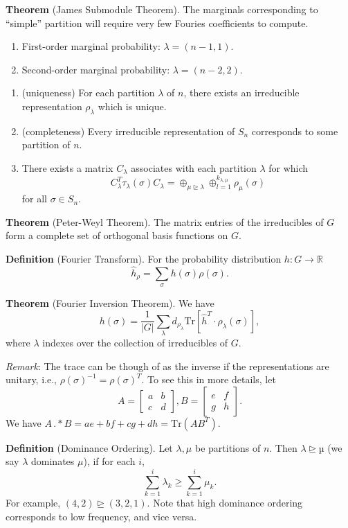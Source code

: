 \documentclass[10pt,reqno]{amsart}
\newcommand{\R}{\mathbb{R}}
\theoremstyle{definition}
\numberwithin{equation}{section}
\begin{document}
\noindent \textbf{Theorem} (James Submodule Theorem).
The marginals corresponding to ``simple'' partition
will require very few Fouries coefficients to compute.
\begin{enumerate}
\item  First-order marginal probability:
$\lambda = (n-1, 1).$
\item  Second-order marginal probability:
$\lambda = (n-2, 2).$
\end{enumerate}

\begin{enumerate}
\item (uniqueness) For each partition $\lambda$ of $n$,
there exists an irreducible representation
$\rho_\lambda$ which is unique.
\item (completeness) Every irreducible representation
of $S_n$ corresponds to some partition of $n$.
\item There exists a matrix $C_\lambda$ 
associates with each partition $\lambda$ for which
\[C_{\lambda}^T \tau_\lambda (\sigma) C_\lambda
=
\oplus_{\mu \unrhd \lambda}\oplus_{l=1}^{k_{\lambda,\mu}} \rho_{\mu}(\sigma)\]
for all $\sigma\in S_n.$
\end{enumerate}


\noindent \textbf{Theorem} (Peter-Weyl Theorem).
The matrix entries of the irreducibles
of $G$ form a complete set of orthogonal
basis functions on $G$.


\noindent \textbf{Definition} (Fourier Transform).
For the probability distribution $h:G\to \R$
\[\hat{h}_\rho = \sum_\sigma h(\sigma)\rho(\sigma).\]

\noindent \textbf{Theorem} (Fourier Inversion Theorem).
We have
\[h(\sigma) = \frac{1}{|G|}\sum_{\lambda}
d_{\rho_\lambda} \text{Tr}[\hat{h}^T\cdot \rho_\lambda(\sigma)],\]
where $\lambda$ indexes over the collection
of irreducibles of $G$.

\textit{Remark}: The trace can be though of as the inverse
if the representations are unitary, 
i.e., $\rho(\sigma)^{-1} = \rho(\sigma)^T.$ To
see this in more details,
let 
\[A =
\begin{bmatrix}
a & b\\
c & d
\end{bmatrix},
B =
\begin{bmatrix}
e & f\\
g & h
\end{bmatrix}.
\]
We have $A\,.*B = ae + bf + cg + dh = \text{Tr}(AB^T).$

\noindent \textbf{Definition} (Dominance Ordering).
Let $\lambda, \mu$ be partitions of $n$. Then 
$λ \unrhd µ$ (we say $\lambda$ dominates $\mu$),
if for each $i$, 
\[\sum_{k=1}^i \lambda_k \geq \sum_{k=1}^i \mu_k.\]
For example, $(4,2)\unrhd (3,2,1).$
Note that high dominance ordering 
corresponds to low frequency, and vice versa.
\end{document}
